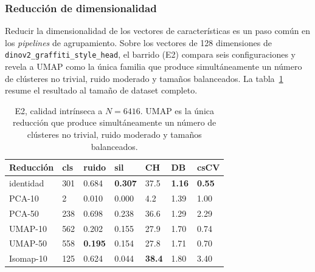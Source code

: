 \subsubsection{Reducción de dimensionalidad}
\label{subsubsec:res-reduccion}
Reducir la dimensionalidad de los vectores de características es un paso común
en los \textit{pipelines} de agrupamiento. Sobre los vectores de 128
dimensiones de \texttt{dinov2\_graffiti\_style\_head}, el barrido (E2) compara
seis configuraciones y revela a UMAP como la única familia que produce
simultáneamente un número de clústeres no trivial, ruido moderado y tamaños
balanceados. La tabla~\ref{tab:e2-quality-6416} resume el resultado al tamaño
de dataset completo.

\begin{table}[h]
  \centering
{\footnotesize
\begin{tabular}{|p{2.0cm}|p{1.0cm}|p{1.0cm}|p{1.2cm}|p{1.0cm}|p{1.0cm}|p{1.0cm}|} \hline
  \textbf{Reducción} & \textbf{cls} & \textbf{ruido} & \textbf{sil} & \textbf{CH} & \textbf{DB} & \textbf{csCV} \\ \hline
  identidad   & 301 & 0.684 &  \textbf{0.307} & 37.5 & \textbf{1.16} & \textbf{0.55} \\ \hline
  PCA-10      & 2   & 0.010 &  0.000 &  4.2 & 1.39 & 1.00 \\ \hline
  PCA-50      & 238 & 0.698 &  0.238 & 36.6 & 1.29 & 2.29 \\ \hline
  UMAP-10     & 562 & 0.202 &  0.155 & 27.9 & 1.70 & 0.74 \\ \hline
  UMAP-50     & 558 & \textbf{0.195} &  0.154 & 27.8 & 1.71 & 0.70 \\ \hline
  Isomap-10   & 125 & 0.624 &  0.044 & \textbf{38.4} & 1.80 & 3.40 \\ \hline
\end{tabular}
}
  \caption[E2, calidad intrínseca a $N=6416$]{E2, calidad intrínseca a $N=6416$. UMAP es la única reducción que
  produce simultáneamente un número de clústeres no trivial, ruido moderado y
  tamaños balanceados. \glosacalidad}
  \label{tab:e2-quality-6416}
\end{table}

